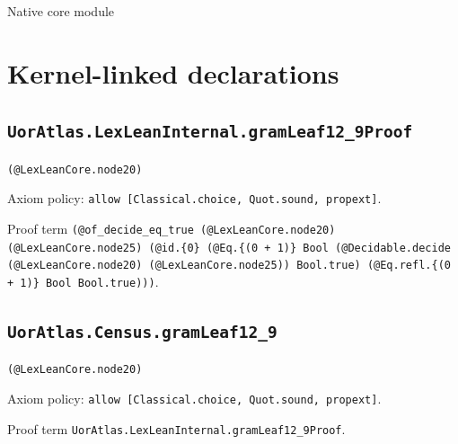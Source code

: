 \documentclass[11pt]{article}
\begin{document}
\begin{center}{\LARGE Native core module}\end{center}
\section*{Kernel-linked declarations}
\subsection*{\texttt{UorAtlas.LexLeanInternal.gramLeaf12\_9Proof}}
\noindent\texttt{(@LexLeanCore.node20)}\par
\noindent Axiom policy: \texttt{allow [Classical.choice, Quot.sound, propext]}.\par
\noindent Proof term \texttt{(@of\_decide\_eq\_true (@LexLeanCore.node20) (@LexLeanCore.node25) (@id.\{0\} (@Eq.\{(0 + 1)\} Bool (@Decidable.decide (@LexLeanCore.node20) (@LexLeanCore.node25)) Bool.true) (@Eq.refl.\{(0 + 1)\} Bool Bool.true)))}.\par
\subsection*{\texttt{UorAtlas.Census.gramLeaf12\_9}}
\noindent\texttt{(@LexLeanCore.node20)}\par
\noindent Axiom policy: \texttt{allow [Classical.choice, Quot.sound, propext]}.\par
\noindent Proof term \texttt{UorAtlas.LexLeanInternal.gramLeaf12\_9Proof}.\par
\end{document}
